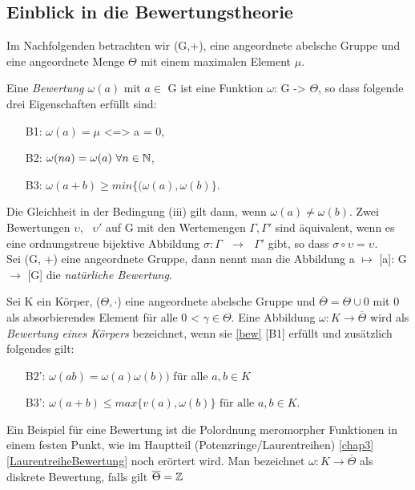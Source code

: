 \subsection{Einblick in die Bewertungstheorie}
Im Nachfolgenden betrachten wir (G,+), eine angeordnete abelsche Gruppe und eine angeordnete Menge $\Theta$ mit einem maximalen Element $\mu$. 
%
%
\begin{defn}\label{bew}
Eine \textit{Bewertung $\omega\left(a\right)$} mit $a\in$ G ist eine Funktion $\omega$: G -> $\Theta$, so dass folgende drei Eigenschaften erfüllt sind:
%
\begin{enumerate}
\item[B1:] $\omega{(a)} = \mu $  <=> a = 0,
\item[B2:]  $\omega{(na)} = \omega{(a)} \text{  } \forall n \in \mathbb{N} $,
\item[B3:] $ \omega{(a+ b)} \ge min\{(\omega{(a)}, \omega{(b)}\}$.
\end{enumerate}
%
\end{defn}
Die Gleichheit in der Bedingung (iii) gilt dann, wenn $\omega{(a)} \ne \omega{(b)} $. Zwei Bewertungen $\upsilon, \text{ } \upsilon' $ auf G mit den Wertemengen $\Gamma , \Gamma' $ sind äquivalent, wenn es eine ordnungstreue bijektive Abbildung $\sigma : \Gamma \text{ } \rightarrow \text{ } \Gamma' $ gibt, so dass $ \sigma \circ \upsilon = \upsilon  $.\\
Sei (G, +) eine angeordnete Gruppe, dann nennt man die Abbildung a $\mapsto$ [a]: G $\to$ [G] die \textit{natürliche Bewertung}. \cite{priesscrampe83}
\begin{defn} \cite{priesscrampe83} \label{bewKoerper}
Sei K ein Körper, ($\Theta, \cdot$) eine angeordnete abelsche Gruppe und $\overline{\Theta}  = \Theta \cup {0} $ mit 0 als absorbierendes Element für alle 0 < $\gamma \in \Theta$. Eine Abbildung $\omega: K \to \overline{\Theta} $ wird als \textit{Bewertung eines Körpers} bezeichnet, wenn sie \ref{bew} [B1] erfüllt und zusätzlich folgendes gilt:
%
\begin{enumerate}
\item[B2':] $\omega(ab) = \omega\left(a\right)\omega\left(b\right)) $ für alle $ a, b \in K$
\item[B3':] $\omega\left(a+b\right) \leq max\lbrace v(a),\omega\left(b \right)\rbrace \text{ für alle }  a, b \in K. $
\end{enumerate}
\end{defn}
Ein Beispiel für eine Bewertung ist die Polordnung meromorpher Funktionen in einem festen Punkt, wie im Hauptteil (Potenzringe/Laurentreihen) \ref{chap3} \ref*{LaurentreiheBewertung} noch erörtert wird. %
Man bezeichnet $\omega: K \to \overline{\Theta} $ als diskrete Bewertung, falls gilt $ \overline{\Theta} = \mathbb{Z}$
% 
%
